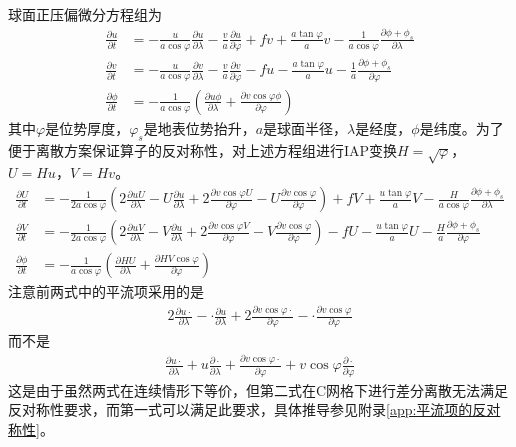 \documentclass{ctexart}
\begin{document}
球面正压偏微分方程组为
\begin{align}
  \frac{\partial u}{\partial t} & = - \frac{u}{a \cos{\varphi}} \frac{\partial u}{\partial \lambda} - \frac{v}{a} \frac{\partial u}{\partial \varphi} + f v + \frac{a \tan{\varphi}}{a} v - \frac{1}{a \cos{\varphi}} \frac{\partial \phi + \phi_s}{\partial \lambda} \\
  \frac{\partial v}{\partial t} & = - \frac{u}{a \cos{\varphi}} \frac{\partial v}{\partial \lambda} - \frac{v}{a} \frac{\partial v}{\partial \varphi} - f u - \frac{a \tan{\varphi}}{a} u - \frac{1}{a} \frac{\partial \phi + \phi_s}{\partial \varphi} \\
  \frac{\partial \phi}{\partial t} & = - \frac{1}{a \cos{\varphi}} \left( \frac{\partial u \phi}{\partial \lambda} + \frac{\partial v \cos{\varphi} \phi}{\partial \varphi} \right)
\end{align}
其中$\varphi$是位势厚度，$\varphi_s$是地表位势抬升，$a$是球面半径，$\lambda$是经度，$\phi$是纬度。为了便于离散方案保证算子的反对称性，对上述方程组进行IAP变换$H = \sqrt{\varphi}$，$U = H u$，$V = H v$。
\begin{align}
	\frac{\partial U}{\partial t} & = - \frac{1}{2 a \cos{\varphi}} \left( 2 \frac{\partial u U}{\partial \lambda} - U \frac{\partial u}{\partial \lambda} + 2 \frac{\partial v \cos{\varphi} U}{\partial \varphi} - U \frac{\partial v \cos{\varphi}}{\partial \varphi} \right) + f V + \frac{u \tan{\varphi}}{a} V - \frac{H}{a \cos{\varphi}} \frac{\partial \phi + \phi_s}{\partial \lambda} \\
  \frac{\partial V}{\partial t} & = - \frac{1}{2 a \cos{\varphi}} \left( 2 \frac{\partial u V}{\partial \lambda} - V \frac{\partial u}{\partial \lambda} + 2 \frac{\partial v \cos{\varphi} V}{\partial \varphi} - V \frac{\partial v \cos{\varphi}}{\partial \varphi} \right) - f U - \frac{u \tan{\varphi}}{a} U - \frac{H}{a} \frac{\partial \phi + \phi_s}{\partial \varphi} \\
  \frac{\partial \phi}{\partial t} & = - \frac{1}{a \cos{\varphi}} \left( \frac{\partial H U}{\partial \lambda} + \frac{\partial H V \cos{\varphi}}{\partial \varphi} \right)
\end{align}
注意前两式中的平流项采用的是
\begin{align}
  2 \frac{\partial u \cdot}{\partial \lambda} - \cdot \frac{\partial u}{\partial \lambda} + 2 \frac{\partial v \cos{\varphi} \cdot}{\partial \varphi} - \cdot \frac{\partial v \cos{\varphi}}{\partial \varphi}
\end{align}
而不是
\begin{align}
  \frac{\partial u \cdot}{\partial \lambda} + u \frac{\partial \cdot}{\partial \lambda} + \frac{\partial v \cos{\varphi} \cdot}{\partial \varphi} + v \cos{\varphi} \frac{\partial \cdot}{\partial \varphi}
\end{align}
这是由于虽然两式在连续情形下等价，但第二式在C网格下进行差分离散无法满足反对称性要求，而第一式可以满足此要求，具体推导参见附录\ref{app:平流项的反对称性}。
\end{document}
